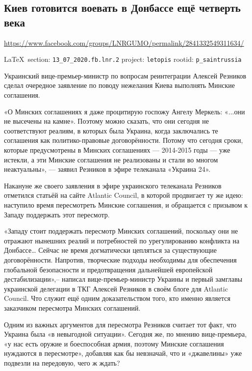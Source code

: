  
 

\subsection{Киев готовится воевать в Донбассе ещё четверть века}
\label{sec:13_07_2020.fb.lnr.2}
\url{https://www.facebook.com/groups/LNRGUMO/permalink/2841332549311634/}
  
\vspace{0.5cm}
{\ifDEBUG\small\LaTeX~section: \verb|13_07_2020.fb.lnr.2| project: \verb|letopis| rootid: \verb|p_saintrussia|\fi}
\vspace{0.5cm}

Украинский вице-премьер-министр по вопросам реинтеграции Алексей Резников
сделал очередное заявление по поводу нежелания Киева выполнять Минские
соглашения.

«О Минских соглашениях я даже процитирую госпожу Ангелу Меркель: «...они не
высечены на камне». Поэтому можно сказать, что они сегодня не соответствуют
реалиям, в которых была Украина, когда заключались те соглашения как
политико-правовые договорённости. Потому что сегодня сроки, которые
предусмотрены в Минских соглашениях --- 2014-2015 годы --- уже истекли, а эти
Минские соглашения не реализованы и стали во многом неактуальны», --- заявил
Резников в эфире телеканала «Украина 24».

Накануне же своего заявления в эфире украинского телеканала Резников отметился
статьёй на сайте Atlantic Council, в которой продвигает ту же идею: наступило
время пересмотреть Минские соглашения, и обращается с призывом к Западу
поддержать этот пересмотр.

«Западу стоит поддержать пересмотр Минских соглашений, поскольку они не
отражают нынешних реалий и потребностей по урегулированию конфликта на
Донбассе… Сейчас не время догматически цепляться за существующие
договорённости. Напротив, творческие подходы необходимы для обеспечения
глобальной безопасности и предотвращения дальнейшей европейской
дестабилизации»,– написал вице-премьер-министр Украины и первый замглавы
украинской делегации в ТКГ Алексей Резников в своём блоге для Atlantic Council.
Что служит ещё одним доказательством того, кто именно является заказчиком
пересмотра Минских соглашений.

Одним из важных аргументов для пересмотра Резников считает тот факт, что
Украина была «в невыгодной ситуации». Сегодня же, по мнению вице-премьера, «у
нас есть оружие и боеспособная армия, поэтому Минские соглашения нуждаются в
пересмотре», добавляя как бы невзначай, что и «джавелины» уже подвезли на
передовую, чего ж ждать?

